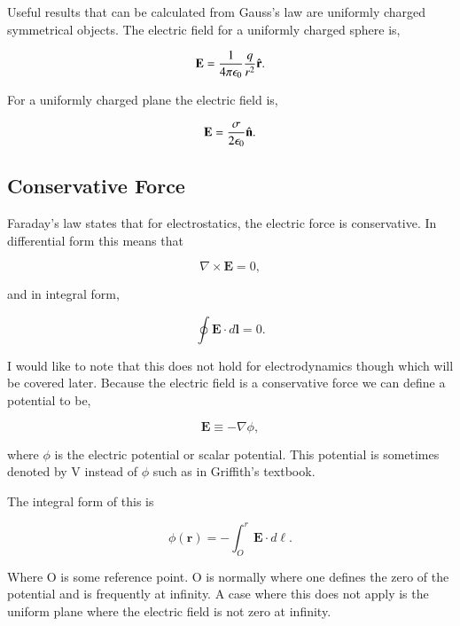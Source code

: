 \documentclass[preprint, review,12pt]{elsarticle}
\def\x{\times}
\def\.{\cdot}
\def\b{\textbf}
\def\bell{\bm{\ell}}
\begin{document}
Useful results that can be calculated from Gauss's law are uniformly charged symmetrical objects. The electric field for a uniformly charged sphere is,

\begin{equation}
    \b{E}= \frac{1}{4 \pi \epsilon_0} \frac{q}{r^2}\hat{\b r}.
\end{equation}

For a uniformly charged plane the electric field is,

\begin{equation}
    \b{E} = \frac{\sigma}{2\epsilon_0}\hat{\b n}.
\end{equation}

\subsection{Conservative Force}

Faraday's law states that for electrostatics, the electric force is conservative. In differential form this means that

\begin{equation}
    \nabla \x \b{E} = 0,
\end{equation}

and in integral form,

\begin{equation}
    \oint \b{E} \. d\b{l} = 0.
\end{equation}

I would like to note that this does not hold for electrodynamics though which will be covered later. Because the electric field is a conservative force we can define a potential to be,

\begin{equation}
    \b{E} \equiv -\nabla \phi,
\end{equation}

where $\phi$ is the electric potential or scalar potential. This potential is sometimes denoted by V instead of $\phi$ such as in Griffith's textbook.

The integral form of this is

\begin{equation}
    \phi(\b{r}) = - \int_O^r \b{E}\. d \bell.
\end{equation}

Where O is some reference point. O is normally where one defines the zero of the potential and is frequently at infinity. A case where this does not apply is the uniform plane where the electric field is not zero at infinity. 
\end{document}

